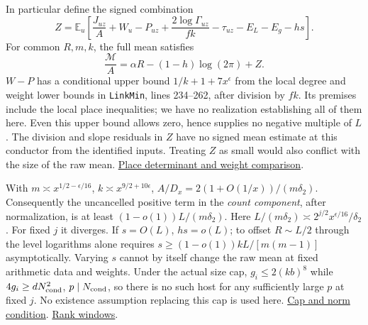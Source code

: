 \documentclass[11pt]{article}
\newcommand{\base}{https://github.com/Deicyde/riemann-hypothesis/blob/e7c8972c701d3396947808ab20cc16dc14623d33/src/}
\newcommand{\pin}[3]{\href{\base#1.lean\##2}{#3}}
\newcommand{\schur}{Formalism/SharpRestriction/GlobalSchurBounds/}
\newcommand{\mean}{\mathbb E}
\begin{document}
In particular define the signed combination
\[
 Z=\mean_{u}\left[\frac{J_{uz}}A+W_u-P_{uz}+\frac{2\log\Gamma_{uz}}{fk}
                          -\tau_{uz}-E_L-E_g-hs\right].
\]
For common $R,m,k$, the full mean satisfies
\begin{equation}
 \frac{\mathcal M}{A}=\alpha R-(1-h)\log(2\pi)+Z. \label{eq:full}
\end{equation}
$W-P$ has a conditional upper bound $1/k+1+7x^\epsilon$ from the local degree and weight lower bounds in \texttt{LinkMin}, lines 234--262, after division by $fk$. Its premises include the local place inequalities; we have no realization establishing all of them here. Even this upper bound allows zero, hence supplies no negative multiple of $L$. The division and slope residuals in $Z$ have no signed mean estimate at this conductor from the identified inputs. Treating $Z$ as small would also conflict with the size of the raw mean. \pin{\schur LinkMin}{L234-L262}{Place determinant and weight comparison}.

With $m\asymp x^{1/2-\epsilon/16}$, $k\asymp x^{9/2+10\epsilon}$,
$A/D_x=2(1+O(1/x))/(m\delta_2)$. Consequently the uncancelled positive term in the \emph{count component}, after normalization, is at least $(1-o(1))L/(m\delta_2)$. Here $L/(m\delta_2)\asymp 2^{j/2}x^{\epsilon/16}/\delta_2$. For fixed $j$ it diverges. If $s=O(L)$, $hs=o(L)$; to offset $R\sim L/2$ through the level logarithms alone requires $s\ge (1-o(1))kL/[m(m-1)]$ asymptotically. Varying $s$ cannot by itself change the raw mean at fixed arithmetic data and weights. Under the actual size cap, $g_i\le2(kb)^8$ while $4g_i\ge dN_{\rm cond}^2$, $p\mid N_{\rm cond}$, so there is no such host for any sufficiently large $p$ at fixed $j$. No existence assumption replacing this cap is used here. \pin{Development/AutomorphicArithmetic/ShortNorms/levelData}{L36-L42}{Cap and norm condition}. \pin{Development/AbelianVarietyTheory/Definitions/GlobalTwisting/PairRowIffQdRows}{L28-L32}{Rank windows}.

\newpage
\end{document}
